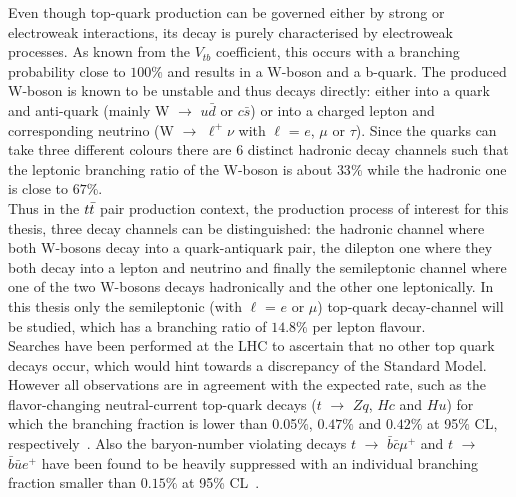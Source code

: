 Even though top-quark production can be governed either by strong or electroweak interactions, its decay is purely characterised by electroweak processes. As known from the $V_{tb}$ coefficient, this occurs with a branching probability close to $100\%$ and results in a W-boson and a b-quark. 
The produced W-boson is known to be unstable and thus decays directly: either into a quark and anti-quark (mainly W $\rightarrow$ $u\bar{d}$ or $c\bar{s}$) or into a charged lepton and corresponding neutrino (W $\rightarrow$ $\ell^{+}\nu$ with $\ell$ = $e$, $\mu$ or $\tau$).
Since the quarks can take three different colours there are 6 distinct hadronic decay channels such that the leptonic branching ratio of the W-boson is about $33\%$ while the hadronic one is close to $67\%$. %
\\
Thus in the $t\bar{t}$ pair production context, the production process of interest for this thesis, three decay channels can be distinguished: the hadronic channel where both W-bosons decay into a quark-antiquark pair, the dilepton one where they both decay into a lepton and neutrino and finally the semileptonic channel where one of the two W-bosons decays hadronically and the other one leptonically. 
In this thesis only the semileptonic (with $\ell$ = $e$ or $\mu$) top-quark decay-channel will be studied, which has a branching ratio of $14.8\%$ per lepton flavour.
\\

Searches have been performed at the LHC to ascertain that no other top quark decays occur, which would hint towards a discrepancy of the Standard Model. However all observations are in agreement with the expected rate, such as the flavor-changing neutral-current top-quark decays ($t$ $\rightarrow$ $Zq$, $Hc$ and $Hu$) for which the branching fraction is lower than 0.05$\%$, $0.47\%$ and $0.42\%$ at 95$\%$ CL, respectively~\cite{CMStZqDecayBR, CMStHqDecayBR}. Also the baryon-number violating decays $t$ $\rightarrow$ $\bar{b}\bar{c}\mu^{+}$ and $t$ $\rightarrow$ $\bar{b}\bar{u} e^{+}$ have been found to be heavily suppressed with an individual branching fraction smaller than $0.15\%$ at 95\% CL~\cite{CMSBNVDecayBR}.
\\

